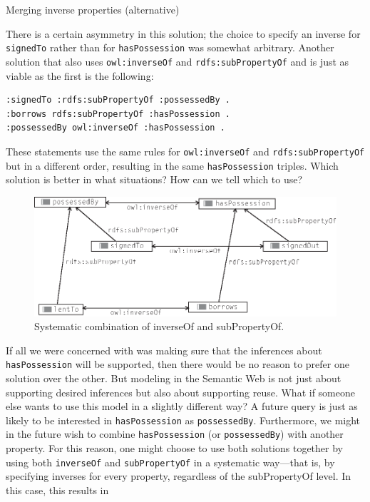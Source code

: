 \begin{challenge}{Merging inverse properties}
\solution (alternative)

There is a certain asymmetry in this solution; the choice to specify an
inverse for \texttt{signedTo} rather than for \texttt{hasPossession} was somewhat
arbitrary. Another solution that also uses \texttt{owl:inverseOf} and
\texttt{rdfs:subPropertyOf} and is just as viable as the first is the following:

\begin{lstlisting}
:signedTo :rdfs:subPropertyOf :possessedBy .
:borrows rdfs:subPropertyOf :hasPossession .
:possessedBy owl:inverseOf :hasPossession .
\end{lstlisting}

These statements use the same rules for \texttt{owl:inverseOf} and
\texttt{rdfs:subPropertyOf} but in a different order, resulting in the same
\texttt{hasPossession} triples. Which solution is better in what situations? How
can we tell which to use?



\begin{figure}
\centering
\includegraphics[width=5in]{media/ch9/f09-002.eps}
\caption{Systematic combination of inverseOf and subPropertyOf.}
\label{fig:ch9.2}
\end{figure}


If all we were concerned with was making sure that the inferences about
\texttt{hasPossession} will be supported, then there would be no reason to prefer
one solution over the other. But modeling in the Semantic Web is not
just about supporting desired inferences but also about supporting
reuse. What if someone else
wants to use this model in a slightly different way? A future query is
just as likely to be interested in \texttt{hasPossession} as \texttt{possessedBy}.
Furthermore, we might in the future wish to combine \texttt{hasPossession} (or
\texttt{possessedBy}) with another property. For this reason, one might choose to
use both solutions together by using both \texttt{inverseOf} and \texttt{subPropertyOf} in
a systematic way---that is, by specifying inverses for every property,
regardless of the subPropertyOf level. In this case, this results in


\end{challenge}
